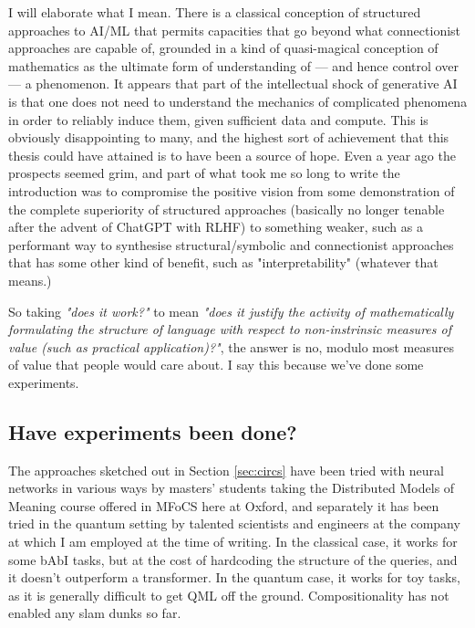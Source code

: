 I will elaborate what I mean. There is a classical conception of structured approaches to AI/ML that permits capacities that go beyond what connectionist approaches are capable of, grounded in a kind of quasi-magical conception of mathematics as the ultimate form of understanding of --- and hence control over --- a phenomenon. It appears that part of the intellectual shock of generative AI is that one does not need to understand the mechanics of complicated phenomena in order to reliably induce them, given sufficient data and compute. This is obviously disappointing to many, and the highest sort of achievement that this thesis could have attained is to have been a source of hope. Even a year ago the prospects seemed grim, and part of what took me so long to write the introduction was to compromise the positive vision from some demonstration of the complete superiority of structured approaches (basically no longer tenable after the advent of ChatGPT with RLHF) to something weaker, such as a performant way to synthesise structural/symbolic and connectionist approaches that has some other kind of benefit, such as "interpretability" (whatever that means.)

So taking \emph{"does it work?"} to mean \emph{"does it justify the activity of mathematically formulating the structure of language with respect to non-instrinsic measures of value (such as practical application)?"}, the answer is no, modulo most measures of value that people would care about. I say this because we've done some experiments.

\subsection{Have experiments been done?}

The approaches sketched out in Section \ref{sec:circs} have been tried with neural networks in various ways by masters' students taking the Distributed Models of Meaning course offered in MFoCS here at Oxford, and separately it has been tried in the quantum setting by talented scientists and engineers at the company at which I am employed at the time of writing. In the classical case, it works for some bAbI tasks, but at the cost of hardcoding the structure of the queries, and it doesn't outperform a transformer. In the quantum case, it works for toy tasks, as it is generally difficult to get QML off the ground. Compositionality has not enabled any slam dunks so far.\\

